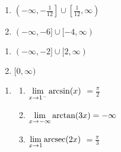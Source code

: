 \documentclass{ximera}
\begin{document}
\begin{multicols}{2}

\begin{enumerate}

\setcounter{enumi}{\value{HW}}

\item  $\left(-\infty, -\frac{1}{12}\right] \cup \left[\frac{1}{12}, \infty\right)$
\item  $(-\infty, -6] \cup [-4, \infty)$ 

\setcounter{HW}{\value{enumi}}

\end{enumerate}

\end{multicols}

\begin{multicols}{2}

\begin{enumerate}

\setcounter{enumi}{\value{HW}}

\item $(-\infty, -2] \cup [2, \infty)$
\item  $[0, \infty)$

\setcounter{HW}{\value{enumi}}

\end{enumerate}
\end{multicols}


\begin{enumerate}
\setcounter{enumi}{\value{HW}}


\item   \begin{multicols}{3} \begin{enumerate} \setcounter{enumi}{\value{HW}} \item $\ds{ \lim_{x \rightarrow 1^{-}} \arcsin(x)}$ $=\frac{\pi}{2}$

\item  $\ds{\lim_{x \rightarrow -\infty} \arctan(3x) = -\infty}$

\item  $\ds{\lim_{x \rightarrow 1} \text{arcsec}(2x)}$ $= \frac{\pi}{3}$

\end{enumerate}
\end{multicols}
\end{enumerate}
\end{document}
